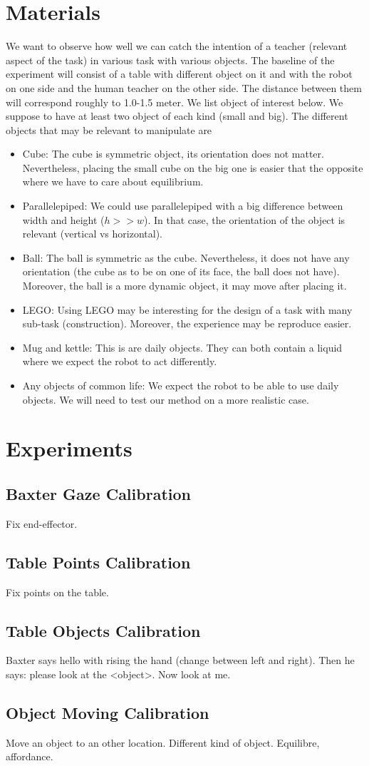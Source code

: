 \documentclass[11pt,a4paper]{article}
\begin{document}
\section{Materials}
We want to observe how well we can catch the intention of a teacher (relevant aspect of the task) in various task with various objects. The baseline of the experiment will consist of a table with different object on it and with the robot on one side and the human teacher on the other side. The distance between them will correspond roughly to 1.0-1.5 meter. We list object of interest below. We suppose to have at least two object of each kind (small and big). The different objects that may be relevant to manipulate are
\begin{itemize}
\item Cube: The cube is symmetric object, its orientation does not matter. Nevertheless, placing the small cube on the big one is easier that the opposite where we have to care about equilibrium.
\item Parallelepiped: We could use parallelepiped with a big difference between width and height ($h>>w$). In that case, the orientation of the object is relevant (vertical vs horizontal).
\item Ball: The ball is symmetric as the cube. Nevertheless, it does not have any orientation (the cube as to be on one of its face, the ball does not have). Moreover, the ball is a more dynamic object, it may move after placing it.
\item LEGO: Using LEGO may be interesting for the design of a task with many sub-task (construction). Moreover, the experience may be reproduce easier.
\item Mug and kettle: This is are daily objects. They can both contain a liquid where we expect the robot to act differently.
\item Any objects of common life: We expect the robot to be able to use daily objects. We will need to test our method on a more realistic case.
\end{itemize}

\section{Experiments}
\subsection{Baxter Gaze Calibration}
Fix end-effector.
\subsection{Table Points Calibration}
Fix points on the table.
\subsection{Table Objects Calibration}
Baxter says hello with rising the hand (change between left and right). Then he says: please look at the <object>. Now look at me.
\subsection{Object Moving Calibration}
Move an object to an other location. Different kind of object. Equilibre, affordance.
\end{document}
